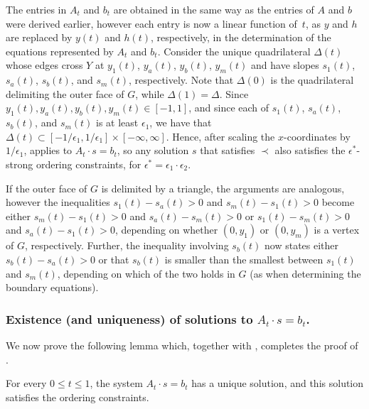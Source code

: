 The entries in $A_t$ and $b_t$ are obtained in the same way as the entries of $A$ and $b$ were derived earlier, however each entry is now a linear function of~$t$, as $y$ and $h$ are replaced by $y(t)$ and $h(t)$, respectively, in the determination of the equations represented by $A_t$ and $b_t$.
Consider the unique quadrilateral $\Delta(t)$ whose edges cross $Y$ at
$y_1(t)$, $y_a(t)$, $y_b(t)$, $y_m(t)$ and have slopes $s_1(t)$,
$s_a(t)$, $s_b(t)$, and $s_m(t)$, respectively. Note that $\Delta(0)$ is the quadrilateral delimiting the outer face of $G$, while $\Delta(1)=\Delta$. Since $y_1(t),y_a(t),y_b(t),y_m(t)\in [-1,1]$, and since each of $s_1(t)$,
$s_a(t)$, $s_b(t)$, and $s_m(t)$ is at least $\epsilon_1$, we have that $\Delta(t)\subset[-1/\epsilon_1,1/\epsilon_1]\times[-\infty,\infty]$.
Hence, after scaling the $x$-coordinates by $1/\epsilon_1$,
 applies to $A_t\cdot s =b_t$, so any solution $s$
that satisfies $\prec$ also satisfies the $\epsilon^*$-strong ordering
constraints, for $\epsilon^*=\epsilon_1\cdot\epsilon_2$.

If the outer face of $G$ is delimited by a triangle, the arguments are analogous, however the inequalities $s_1(t)-s_a(t)>0$ and $s_m(t)-s_1(t)>0$ become either $s_m(t)-s_1(t)>0$ and $s_a(t)-s_m(t)>0$ or $s_1(t)-s_m(t)>0$ and $s_a(t)-s_1(t)>0$, depending on whether $(0,y_1)$ or $(0,y_m)$ is a vertex of $G$, respectively. Further, the inequality involving $s_b(t)$ now states  either $s_b(t)-s_a(t)>0$ or that $s_b(t)$ is smaller than the smallest between $s_1(t)$ and $s_m(t)$, depending on which of the two holds in $G$ (as when determining the boundary equations).

\subsubsection{Existence (and uniqueness) of solutions to $A_t\cdot s=b_t$.}
%
We now prove the following lemma which, together with , completes the proof of .

\begin{lem}
	For every $0\le t\le 1$, the system $A_t\cdot s=b_t$ has a unique solution,
	and this solution satisfies the ordering constraints. %
\end{lem}

